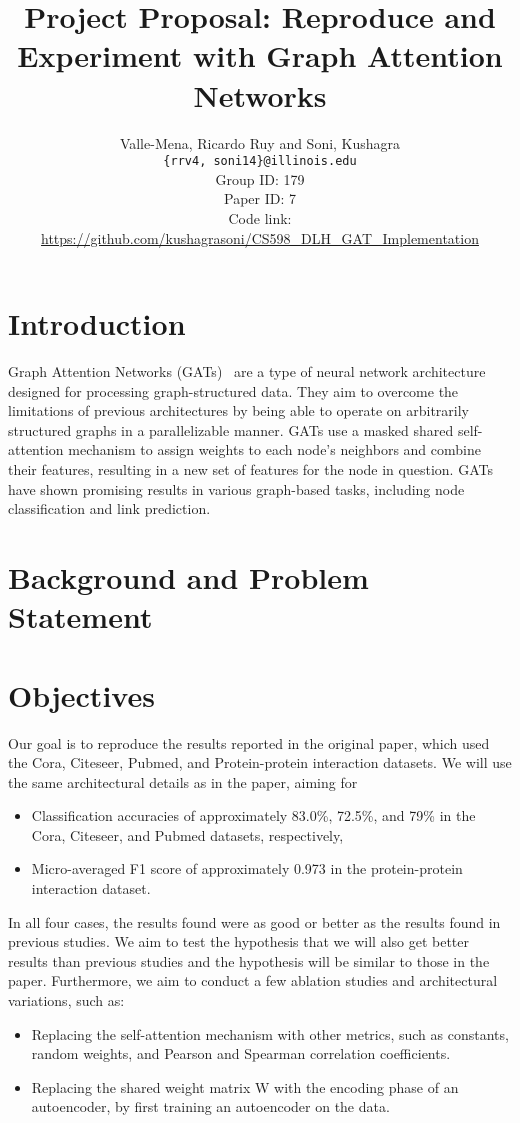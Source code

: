 \documentclass{article}
\title{Project Proposal: Reproduce and Experiment with Graph Attention Networks}
\author
{Valle-Mena, Ricardo Ruy and Soni, Kushagra \\
    \texttt{\{rrv4, soni14\}@illinois.edu}
    \\[2em]
    Group ID: 179\\
    Paper ID: 7\\
    Code link: \url{https://github.com/kushagrasoni/CS598_DLH_GAT_Implementation}
    \\[2em]
}
\begin{document}
    \maketitle

    \section{Introduction}\label{sec:introduction}

    Graph Attention Networks (GATs)~\cite{velickovic2018graph} are a type of neural network architecture designed for
    processing graph-structured data.
    They aim to overcome the limitations of previous architectures by being able to operate on arbitrarily structured graphs in a parallelizable manner.
    GATs use a masked shared self-attention mechanism to assign weights to each node's neighbors and combine their features, resulting in a new set of features for the node in question.
    GATs have shown promising results in various graph-based tasks, including node classification and link prediction.


    \section{Background and Problem Statement}\label{sec:background-and-problem-statement}
    

    \section{Objectives}\label{sec:objectives}
    Our goal is to reproduce the results reported in the original paper, which used the Cora, Citeseer, Pubmed, and Protein-protein interaction datasets.
    We will use the same architectural details as in the paper, aiming for
    \begin{itemize}
        \item Classification accuracies of approximately 83.0\%, 72.5\%, and 79\% in the Cora, Citeseer, and Pubmed
        datasets, respectively,
        \item Micro-averaged F1 score of approximately 0.973 in the protein-protein interaction dataset.
    \end{itemize}

    In all four cases, the results found were as good or better as the results found in previous studies.
    We aim to test the hypothesis that we will also get better results than previous studies and the hypothesis will
    be similar to those in the paper.
    Furthermore, we aim to conduct a few ablation studies and architectural
    variations, such as:
    \begin{itemize}
        \item Replacing the self-attention mechanism with other metrics, such as
    constants, random weights, and Pearson and Spearman correlation
    coefficients.
        \item Replacing the shared weight matrix W with the encoding phase of an
    autoencoder, by first training an autoencoder on the data.
    \end{itemize}
\end{document}
